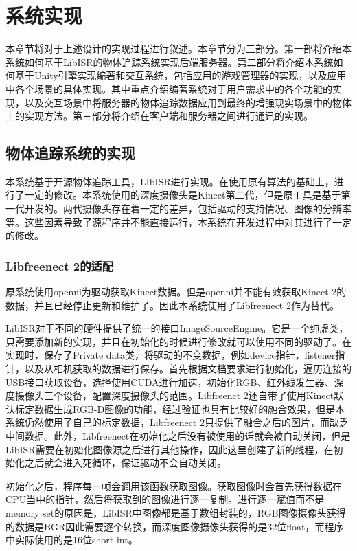 \chapter{系统实现}
\label{implement}

本章节将对于上述设计的实现过程进行叙述。本章节分为三部分。第一部将介绍本系统如何基于LibISR的物体追踪系统\cite{Ren_3DV_2014, star3d_iccv_2013}实现后端服务器。第二部分将介绍本系统如何基于Unity引擎实现编著和交互系统，包括应用的游戏管理器的实现，以及应用中各个场景的具体实现。其中重点介绍编著系统对于用户需求中的各个功能的实现，以及交互场景中将服务器的物体追踪数据应用到最终的增强现实场景中的物体上的实现方法。第三部分将介绍在客户端和服务器之间进行通讯的实现。

\section{物体追踪系统的实现}
本系统基于开源物体追踪工具，LIbISR进行实现。在使用原有算法的基础上，进行了一定的修改。本系统使用的深度摄像头是Kinect第二代，但是原工具是基于第一代开发的。两代摄像头存在着一定的差异，包括驱动的支持情况、图像的分辨率等。这些因素导致了源程序并不能直接运行，本系统在开发过程中对其进行了一定的修改。

\subsection{Libfreenect 2的适配}

原系统使用openni为驱动获取Kinect数据。但是openni并不能有效获取Kinect 2的数据，并且已经停止更新和维护了。因此本系统使用了Libfreenect 2作为替代。

LibISR对于不同的硬件提供了统一的接口ImageSourceEngine。它是一个纯虚类，只需要添加新的实现，并且在初始化的时候进行修改就可以使用不同的驱动了。在实现时，保存了Private data类，将驱动的不变数据，例如device指针，listener指针，以及从相机获取的数据进行保存。首先根据文档要求进行初始化，遍历连接的USB接口获取设备，选择使用CUDA进行加速，初始化RGB、红外线发生器、深度摄像头三个设备，配置深度摄像头的范围。Libfreenct 2还自带了使用Kinect默认标定数据生成RGB-D图像的功能，经过验证也具有比较好的融合效果，但是本系统仍然使用了自己的标定数据，Libfreenect 2只提供了融合之后的图片，而缺乏中间数据。此外，Libfreenect在初始化之后没有被使用的话就会被自动关闭，但是LibISR需要在初始化图像源之后进行其他操作，因此这里创建了新的线程，在初始化之后就会进入死循环，保证驱动不会自动关闭。

初始化之后，程序每一帧会调用该函数获取图像。获取图像时会首先获得数据在CPU当中的指针，然后将获取到的图像进行逐一复制。进行逐一赋值而不是memory set的原因是，LibISR中图像都是基于数组封装的，RGB图像摄像头获得的数据是BGR因此需要逐个转换，而深度图像摄像头获得的是32位float，而程序中实际使用的是16位short int。

